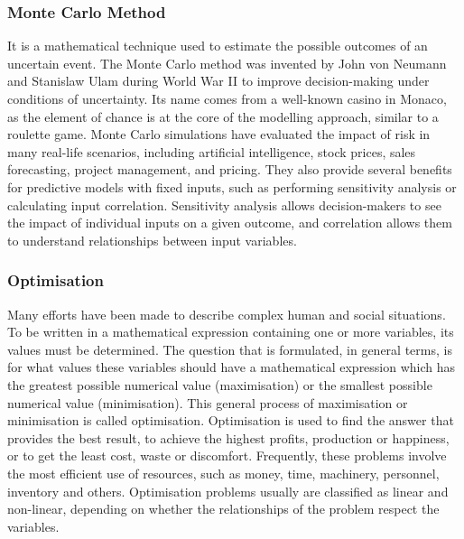 \documentclass[11pt, letterpaper, english]{article}
\begin{document}
\subsubsection{Monte Carlo Method}

    \par{It is a mathematical technique used to estimate the possible outcomes of an uncertain event. The Monte Carlo method was invented by John von Neumann and Stanislaw Ulam during World War II to improve decision-making under conditions of uncertainty. Its name comes from a well-known casino in Monaco, as the element of chance is at the core of the modelling approach, similar to a roulette game. Monte Carlo simulations have evaluated the impact of risk in many real-life scenarios, including artificial intelligence, stock prices, sales forecasting, project management, and pricing. They also provide several benefits for predictive models with fixed inputs, such as performing sensitivity analysis or calculating input correlation. Sensitivity analysis allows decision-makers to see the impact of individual inputs on a given outcome, and correlation allows them to understand relationships between input variables\cite{garfinkel_shevtsov_guo_2017}.}
  

\subsubsection{Optimisation}
    \par{Many efforts have been made to describe complex human and social situations. To be written in a mathematical expression containing one or more variables, its values must be determined. The question that is formulated, in general terms, is for what values these variables should have a mathematical expression which has the greatest possible numerical value (maximisation) or the smallest possible numerical value (minimisation). This general process of maximisation or minimisation is called optimisation. Optimisation is used to find the answer that provides the best result, to achieve the highest profits, production or happiness, or to get the least cost, waste or discomfort. Frequently, these problems involve the most efficient use of resources, such as money, time, machinery, personnel, inventory and others. Optimisation problems usually are classified as linear and non-linear, depending on whether the relationships of the problem respect the variables.\cite{Arsham_1996}}

    
\end{document}
